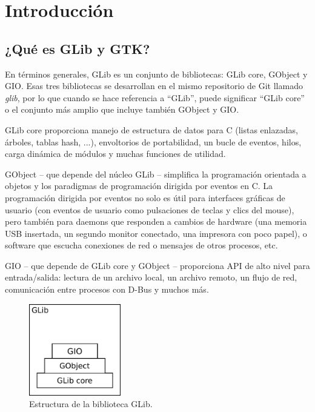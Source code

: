 \chapter{Introducción}

\section{¿Qué es GLib y GTK?}

En términos generales, GLib es un conjunto de bibliotecas: GLib core, GObject y GIO. Esas tres bibliotecas se desarrollan en el mismo repositorio de Git llamado \emph{glib}, por lo que cuando se hace referencia a ``GLib'', puede significar ``GLib core'' o el conjunto más amplio que incluye también GObject y GIO.

GLib core proporciona manejo de estructura de datos para C (listas enlazadas, árboles, tablas hash, ...), envoltorios de portabilidad, un bucle de eventos, hilos, carga dinámica de módulos y muchas funciones de utilidad.

GObject -- que depende del núcleo GLib -- simplifica la programación orientada a objetos y los paradigmas de programación dirigida por eventos en C. La programación dirigida por eventos no solo es útil para interfaces gráficas de usuario (con eventos de usuario como pulsaciones de teclas y clics del mouse), pero también para daemons que responden a cambios de hardware (una memoria USB insertada, un segundo monitor conectado, una impresora con poco papel), o software que escucha conexiones de red o mensajes de otros procesos, etc.

GIO -- que depende de GLib core y GObject -- proporciona API de alto nivel para entrada/salida: lectura de un archivo local, un archivo remoto, un flujo de red, comunicación entre procesos con D-Bus y muchos más.

\begin{figure}
    \centering
    \includegraphics[width=4cm]{assets/img/diag/glib-struct-001.pdf}
    \caption{Estructura de la biblioteca GLib.}
    \label{fig-glib-struct-001}
\end{figure}

